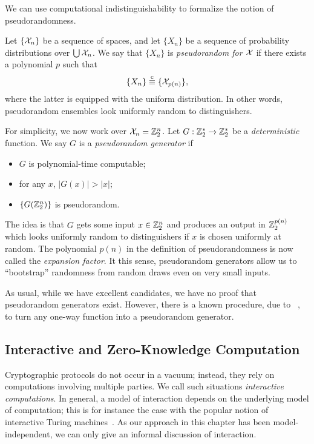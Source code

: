 \begin{ex}\label{ex:pseudorandomness}
  We can use computational indistinguishability to formalize the notion of
  pseudorandomness.

  Let $\{\mathcal{X}_n\}$ be a sequence of spaces, and let $\{X_n\}$ be a sequence of
  probability distributions over $\bigcup \mathcal{X}_n$. We say that $\{X_n\}$ is
  \emph{pseudorandom for $\mathcal{X}$} if there exists a polynomial $p$ such that \[
    \{X_n\} \overset{\text{c}}{\equiv} \{\mathcal{X}_{p(n)}\},
  \]where the latter is equipped with the uniform distribution. In other words,
  pseudorandom ensembles look uniformly random to distinguishers.

  For simplicity, we now work over $\mathcal{X}_n = \mathbb{Z}_2^n$. Let $G:
  \mathbb{Z}_2^*\to\mathbb{Z}_2^*$ be a \emph{deterministic} function. We say $G$
  is a \emph{pseudorandom generator} if \begin{itemize}
    \item $G$ is polynomial-time computable;
    \item for any $x$, $|G(x)| > |x|$;
    \item $\{G(\mathbb{Z}_2^n)\}$ is pseudorandom.
  \end{itemize}
  The idea is that $G$ gets some input $x\in\mathbb{Z}_2^n$ and produces an output in
  $\mathbb{Z}_2^{p(n)}$ which looks uniformly random to distinguishers if $x$ is chosen
  uniformly at random. The polynomial $p(n)$ in the definition of
  pseudorandomness is now called the \emph{expansion factor}. It this sense, pseudorandom generators allow us to
  ``bootstrap'' randomness from random draws even on very small inputs.

  As usual, while we have excellent candidates, we have no proof that
  pseudorandom generators exist. However, there is a known procedure, due
  to \citeauthor{hastad-1999}~\cite{hastad-1999}, to turn any one-way function
  into a pseudorandom generator.
\end{ex}

\subsection{Interactive and Zero-Knowledge Computation}
\label{sec:interactive computation}
\label{sec:zero-knowledge}

Cryptographic protocols do not occur in a vacuum; instead, they rely on
computations involving multiple parties. We call such situations \emph{interactive
computations}. In general, a model of interaction depends on
the underlying model of computation; this is for instance the case with the
popular notion of interactive Turing machines~\cite[Definition
4.2.1]{goldreich-2001}. As our approach in this chapter has been
model-independent, we can only give an informal discussion of interaction.

